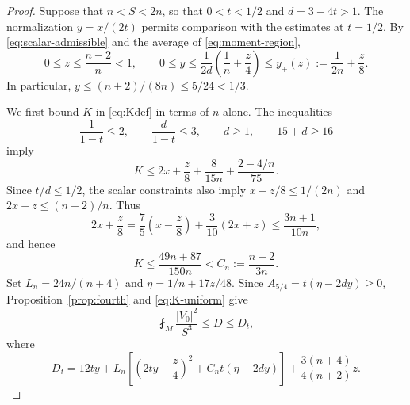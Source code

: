 \documentclass[11pt,reqno]{amsart}
\numberwithin{equation}{section}
\newcommand{\norm}[1]{\lvert #1\rvert}
\begin{document}
\begin{proof}
Suppose that $n<S<2n$, so that $0<t<1/2$ and $d=3-4t>1$. The normalization $y=x/(2t)$ permits comparison with the estimates at $t=1/2$. By \eqref{eq:scalar-admissible} and the average of \eqref{eq:moment-region},
\begin{equation}\label{eq:y-region}
0\le z\le\frac{n-2}{n}<1,
\qquad
0\le y\le\frac1{2d}\left(\frac1n+\frac z4\right)
\le y_+(z):=\frac1{2n}+\frac z8.
\end{equation}
In particular, $y\le(n+2)/(8n)\le5/24<1/3$.

We first bound $K$ in \eqref{eq:Kdef} in terms of $n$ alone. The inequalities
\[
\frac1{1-t}\le2,\qquad
\frac{d}{1-t}\le3,\qquad d\ge1,\qquad 15+d\ge16
\]
imply
\[
K\le 2x+\frac z8+\frac8{15n}+\frac{2-4/n}{75}.
\]
Since $t/d\le1/2$, the scalar constraints also imply
$x-z/8\le1/(2n)$ and $2x+z\le(n-2)/n$. Thus
\[
2x+\frac z8
=\frac75\left(x-\frac z8\right)+\frac3{10}(2x+z)
\le\frac{3n+1}{10n},
\]
and hence
\begin{equation}\label{eq:K-uniform}
K\le\frac{49n+87}{150n}<C_n:=\frac{n+2}{3n}.
\end{equation}
Set $L_n=24n/(n+4)$ and $\eta=1/n+17z/48$. Since
$A_{5/4}=t(\eta-2dy)\ge0$, Proposition~\ref{prop:fourth} and \eqref{eq:K-uniform} give
\begin{equation}\label{eq:Dt}
\fint_M\frac{\norm{V_0}^2}{S^3}\le D\le D_t,
\end{equation}
where
\[
D_t=12ty+L_n\left[\left(2ty-\frac z4\right)^2
+C_nt(\eta-2dy)\right]+\frac{3(n+4)}{4(n+2)}z.
\]


\end{proof}
\end{document}
